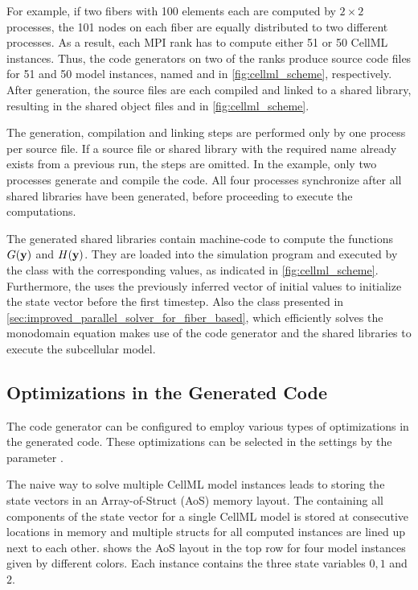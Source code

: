 For example, if two fibers with 100 elements each are computed by $2 \times 2$ processes, the 101 nodes on each fiber are equally distributed to two different processes. As a result, each MPI rank has to compute either 51 or 50 CellML instances. Thus, the code generators on two of the ranks produce source code files for 51 and 50 model instances, named  and  in \cref{fig:cellml_scheme}, respectively. After generation, the source files are each compiled and linked to a shared library, resulting in the shared object files  and  in \cref{fig:cellml_scheme}.

The generation, compilation and linking steps are performed only by one process per source file.
If a source file or shared library with the required name already exists from a previous run, the steps are omitted.
In the example, only two processes generate and compile the code. All four processes synchronize after all shared libraries have been generated, before proceeding to execute the computations.

The generated shared libraries contain machine-code to compute the functions $G(\textbf{y})$ and $H(\textbf{y})$. They are loaded into the simulation program and executed by the  class with the corresponding values, as indicated in \cref{fig:cellml_scheme}. Furthermore, the  uses the previously inferred vector of initial values to initialize the state vector before the first timestep. Also the  class presented in \cref{sec:improved_parallel_solver_for_fiber_based}, which efficiently solves the monodomain equation makes use of the code generator and the shared libraries to execute the subcellular model.

\subsection{Optimizations in the Generated Code}

The code generator can be configured to employ various types of optimizations in the generated code. These optimizations can be selected in the settings by the parameter .

The naive way to solve multiple CellML model instances leads to storing the state vectors
in an Array-of-Struct (AoS) memory layout. The  containing all components of the state vector for a single CellML model is stored at consecutive locations in memory and multiple structs for all computed instances are lined up next to each other.  shows the AoS layout in the top row for four model instances given by different colors. Each instance contains the three state variables $0,1$ and $2$. 

